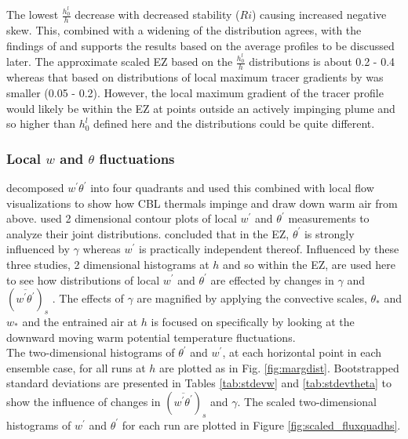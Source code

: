 The lowest $\frac{h^{l}_{0}}{h}$ decrease with decreased stability ($Ri$) causing increased negative skew. This, combined with a widening of the distribution agrees, with the findings of \cite{SullMoengStev} and supports the results based on the average profiles to be discussed later.  The approximate scaled EZ based on the $\frac{h^{l}_{0}}{h}$ distributions is about 0.2 - 0.4 whereas that based on distributions of local maximum tracer gradients by  \cite{BrooksFowler2} was smaller (0.05 - 0.2).  However, the local maximum gradient of the tracer profile would likely be within the EZ at points outside an actively impinging plume and so higher than $h^{l}_{0}$ defined here and the distributions could be quite different. \\  

\subsubsection{Local $w$ and $\theta$ fluctuations}
\label{subsubsec:locfluc}

\cite{SullMoengStev} decomposed $w^{'}\theta^{'}$ into four quadrants and used this combined with local flow visualizations to show how CBL thermals impinge and draw down warm air from above. \cite{MahrtPaum} used 2 dimensional contour plots of local $w^{'}$ and $\theta^{'}$ measurements to analyze their joint distributions.  \cite{Sorbjan1} concluded that in the EZ, $\theta^{'}$ is strongly influenced by $\gamma$  whereas $w^{'}$ is practically independent thereof.  Influenced by these three studies, 2 dimensional histograms at $h$ and so within the EZ, are used here to see how distributions of local $w^{'}$ and $\theta^{'}$ are effected by changes in $\gamma$ and $(\overline{w^{'}\theta^{'}})_{s}$ .  The effects of $\gamma$ are magnified by applying the convective scales, $\theta_{*}$ and $w_{*}$ and the entrained air at $h$ is focused on specifically by looking at the downward moving warm potential temperature fluctuations.\\    

The two-dimensional histograms of $\theta^{'}$ and $w^{'}$, at each horizontal point in each ensemble case, for all runs at $h$ are plotted as in Fig. \ref{fig:margdist}.  Bootstrapped standard deviations are presented in Tables \ref{tab:stdevw} and \ref{tab:stdevtheta} to show the influence of changes in $(\overline{w^{'} \theta^{'}})_{s}$ and $\gamma$.  The scaled two-dimensional histograms of $w^{'}$ and $\theta^{'}$ for each run are plotted in Figure \ref{fig:scaled_fluxquadhs}.\\

